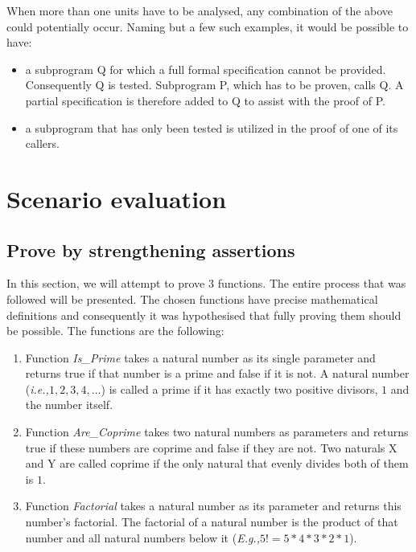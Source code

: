\documentclass{llncs}
\newcommand{\ie}{\textit{i.e.,}\xspace}
\newcommand{\Eg}{\textit{E.g.,}\xspace}
\begin{document}
When more than one units have to be analysed, any combination of the above could
potentially occur. Naming but a few such examples, it would be possible to have:
\begin{itemize}
  \item a subprogram Q for which a full formal specification cannot be provided.
    Consequently Q is tested. Subprogram P, which has to be proven, calls Q.
    A partial specification is therefore added to Q to assist with the proof of P.

  \item a subprogram that has only been tested is utilized in the proof of one of its
    callers.
\end{itemize}

\section{Scenario evaluation}

\subsection{Prove by strengthening assertions}
In this section, we will attempt to prove 3 functions. The entire process that
was followed will be presented. The chosen functions have precise mathematical
definitions and consequently it was hypothesised that fully proving them should
be possible. The functions are the following:
\begin{enumerate}
  \item Function \emph{Is\_Prime} takes a natural number as its single parameter
    and returns true if that number is a prime and false if it is not. A natural
    number (\ie $1, 2, 3, 4, \dots$) is called a prime if it has exactly two
    positive divisors, $1$ and the number itself.

  \item Function \emph{Are\_Coprime} takes two natural numbers as parameters and returns
    true if these numbers are coprime and false if they are not. Two naturals X and Y
    are called coprime if the only natural that evenly divides both of them is $1$.

  \item Function \emph{Factorial} takes a natural number as its parameter and returns
    this number's factorial. The factorial of a natural number is the product of that
    number and all natural numbers below it (\Eg $5! = 5 * 4 * 3 * 2 * 1$).
\end{enumerate}
\end{document}
